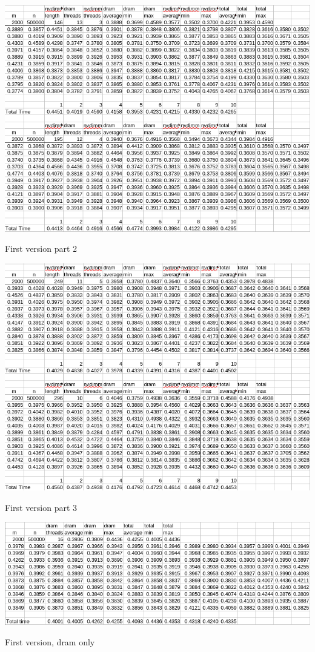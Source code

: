 \documentclass[12pt,a4paper,USenglish]{article}      %
\begin{document}
\begin{table}[!hbtp]
\includegraphics[scale=0.6]{Large_Array_test/Large_array_test_first_version_v3_part2.png}
\caption{First version part 2}
\end{table}

\begin{table}[!hbtp]
\includegraphics[scale=0.6]{Large_Array_test/Large_array_test_first_version_v3_part3.png}
\caption{First version part 3}
\end{table}

\begin{table}[!hbtp]
\includegraphics[scale=0.6]{Large_Array_test/Large_array_test_first_version_DRAM_only.png}
\caption{First version, dram only}
\end{table}
\end{document}
